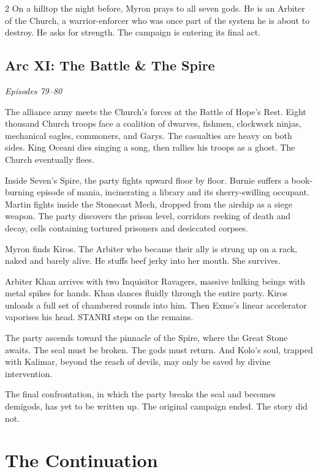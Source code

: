 \begin{multicols}{2}
On a hilltop the night before, Myron prays to all seven gods.  He is an Arbiter of the Church, a warrior-enforcer who was once part of the system he is about to destroy.  He asks for strength.  The campaign is entering its final act.

\subsection*{Arc XI: The Battle \& The Spire}
\textit{Episodes 79--80}

\medskip

\noindent
The alliance army meets the Church's forces at the Battle of Hope's Rest.  Eight thousand Church troops face a coalition of dwarves, fishmen, clockwork ninjas, mechanical eagles, commoners, and Garys.  The casualties are heavy on both sides.  King Oceani dies singing a song, then rallies his troops as a ghost.  The Church eventually flees.

Inside Seven's Spire, the party fights upward floor by floor.  Burnie suffers a book-burning episode of mania, incinerating a library and its sherry-swilling occupant.  Martin fights inside the Stonecast Mech, dropped from the airship as a siege weapon.  The party discovers the prison level, corridors reeking of death and decay, cells containing tortured prisoners and desiccated corpses.

Myron finds Kiros.  The Arbiter who became their ally is strung up on a rack, naked and barely alive.  He stuffs beef jerky into her mouth.  She survives.

Arbiter Khan arrives with two Inquisitor Ravagers, massive hulking beings with metal spikes for hands.  Khan dances fluidly through the entire party.  Kiros unloads a full set of chambered rounds into him.  Then Exme's linear accelerator vaporises his head.  STANRI steps on the remains.

The party ascends toward the pinnacle of the Spire, where the Great Stone awaits.  The seal must be broken.  The gods must return.  And Kolo's soul, trapped with Kalimar, beyond the reach of devils, may only be saved by divine intervention.

The final confrontation, in which the party breaks the seal and becomes demigods, has yet to be written up.  The original campaign ended.  The story did not.

\end{multicols}

\clearpage

\section{The Continuation}

